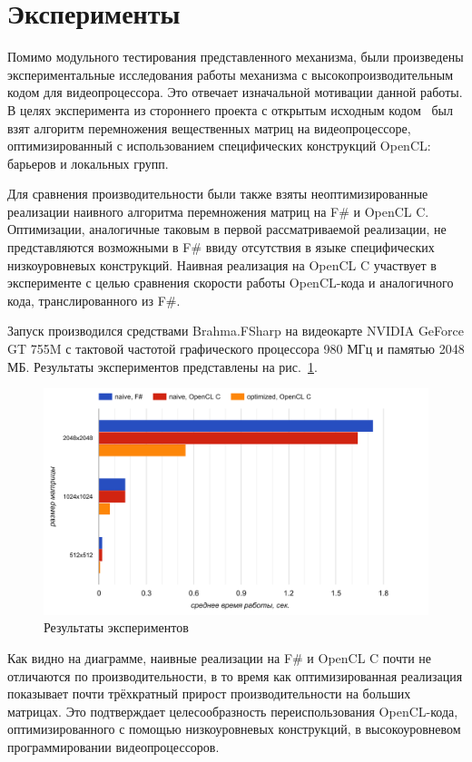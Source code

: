 \section{Эксперименты}
Помимо модульного тестирования представленного механизма, были произведены экспериментальные исследования работы механизма с высокопроизводительным кодом для видеопроцессора. Это отвечает изначальной мотивации данной работы. В целях эксперимента из стороннего проекта с открытым исходным кодом~\cite{MyGEMM} был взят алгоритм перемножения вещественных матриц на видеопроцессоре, оптимизированный с использованием специфических конструкций OpenCL: барьеров и локальных групп.

Для сравнения производительности были также взяты неоптимизированные реализации наивного алгоритма перемножения матриц на F\# и OpenCL C. Оптимизации, аналогичные таковым в первой рассматриваемой реализации, не представляются возможными в F\# ввиду отсутствия в языке специфических низкоуровневых конструкций. Наивная реализация на OpenCL C участвует в эксперименте с целью сравнения скорости работы OpenCL-кода и аналогичного кода, транслированного из F\#.

Запуск производился средствами Brahma.FSharp на видеокарте NVIDIA GeForce GT 755M с тактовой частотой графического процессора 980 МГц и памятью 2048 МБ. Результаты экспериментов представлены на рис.~\ref{experiments}.

\begin{figure}[h]
\centering
\includegraphics[width=\textwidth]{Smirenko/courseworkpictures/chart.png}
\caption{Результаты экспериментов}
\label{experiments}
\end{figure}

Как видно на диаграмме, наивные реализации на F\# и OpenCL C почти не отличаются по производительности, в то время как оптимизированная реализация показывает почти трёхкратный прирост производительности на больших матрицах. Это подтверждает целесообразность переиспользования OpenCL-кода, оптимизированного с помощью низкоуровневых конструкций, в высокоуровневом программировании видеопроцессоров.

